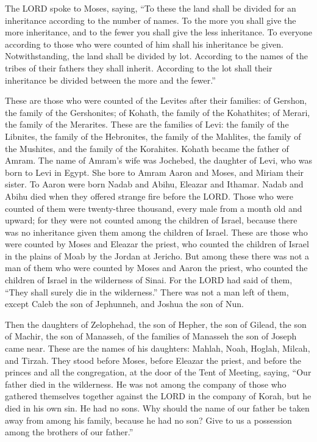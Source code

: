 \myverse{}The LORD spoke to Moses, saying,
\myverse{}“To these the land shall be divided for an inheritance according to the number
of names.
\myverse{}To the more you shall give the more inheritance, and to the fewer you shall
give the less inheritance. To everyone according to those who were counted of him shall his inheritance
be given.
\myverse{}Notwithstanding, the land shall be divided by lot. According to the names
of the tribes of their fathers they shall inherit.
\myverse{}According to the lot shall their inheritance be divided between the more
and the fewer.”


\myverse{}These are those who were counted of the Levites after their
families: of Gershon, the family of the Gershonites; of Kohath, the family of the Kohathites; of Merari,
the family of the Merarites.
\myverse{}These are the families of Levi: the family of the Libnites, the family of
the Hebronites, the family of the Mahlites, the family of the Mushites, and the family of the Korahites.
Kohath became the father of Amram.
\myverse{}The name of Amram’s wife was Jochebed, the daughter of Levi, who was born
to Levi in Egypt. She bore to Amram Aaron and Moses, and Miriam their sister.
\myverse{}To Aaron were born Nadab and Abihu, Eleazar and Ithamar.
\myverse{}Nadab and Abihu died when they offered strange fire before the LORD.
\myverse{}Those who were counted of them were twenty-three thousand, every male from
a month old and upward; for they were not counted among the children of Israel, because there was no inheritance
given them among the children of Israel.
\myverse{}These are those who were counted by Moses and Eleazar the priest, who counted
the children of Israel in the plains of Moab by the Jordan at Jericho.
\myverse{}But among these there was not a man of them who were counted by Moses and
Aaron the priest, who counted the children of Israel in the wilderness of Sinai.
\myverse{}For the LORD had said of them, “They shall surely die in the wilderness.”
There was not a man left of them, except Caleb the son of Jephunneh, and Joshua the son of Nun.


\mychapter{} \myverse*{}Then the daughters of Zelophehad, the son of Hepher, the son of
Gilead, the son of Machir, the son of Manasseh, of the families of Manasseh the son of Joseph came near.
These are the names of his daughters: Mahlah, Noah, Hoglah, Milcah, and Tirzah.
\myverse{}They stood before Moses, before Eleazar the priest, and before the princes
and all the congregation, at the door of the Tent of Meeting, saying,
\myverse{}“Our father died in the wilderness. He was not among the company of those who
gathered themselves together against the LORD in the company of Korah, but he died in his own sin. He
had no sons.
\myverse{}Why should the name of our father be taken away from among his family, because
he had no son? Give to us a possession among the brothers of our father.”


